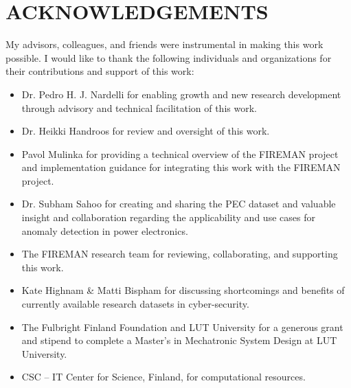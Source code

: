 \section*{\MakeUppercase{Acknowledgements}}
\thispagestyle{empty}
{}%

My advisors, colleagues, and friends were instrumental in making this work possible. I would like to thank the following individuals and organizations for their contributions and support of this work:

\begin{itemize}
    \item Dr. Pedro H. J. Nardelli for enabling growth and new research development through advisory and technical facilitation of this work.
    \item Dr. Heikki Handroos for review and oversight of this work.
    \item Pavol Mulinka for providing a technical overview of the FIREMAN project and implementation guidance for integrating this work with the FIREMAN project.
    \item Dr. Subham Sahoo for creating and sharing the PEC dataset and valuable insight and collaboration regarding the applicability and use cases for anomaly detection in power electronics.
    \item The FIREMAN research team for reviewing, collaborating, and supporting this work.
    \item Kate Highnam \& Matti Bispham for discussing shortcomings and benefits of currently available research datasets in cyber-security.
    \item The Fulbright Finland Foundation and LUT University for a generous grant and stipend to complete a Master's in Mechatronic System Design at LUT University. 
	\item CSC – IT Center for Science, Finland, for computational resources.
\end{itemize}
